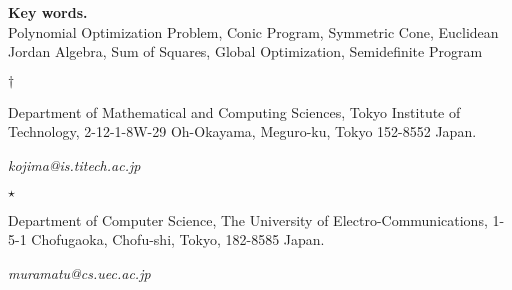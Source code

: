 \vspace{0.3cm}
  
\noindent
{\bf Key words. } \vspace{0.1cm} \\ 
Polynomial Optimization Problem, Conic Program, Symmetric Cone, 
Euclidean Jordan Algebra, 
Sum of Squares, Global Optimization, 
Semidefinite Program

\vspace{0.5cm}

\noindent
\parbox[t]{0.5cm}{$\dagger$}
\parbox[t]{14.9cm}{Department of Mathematical and Computing Sciences,
                   Tokyo Institute of Technology,
                   2-12-1-8W-29  Oh-Okayama, Meguro-ku, Tokyo 152-8552 Japan.
                   
{\it kojima@is.titech.ac.jp}
}


\medskip

\noindent
\parbox[t]{0.5cm}{$\star$}
\parbox[t]{14.9cm}{
Department of Computer Science, 
The University of Electro-Communications, 
1-5-1 Chofugaoka, Chofu-shi, Tokyo, 182-8585 Japan. 

{\it muramatu@cs.uec.ac.jp}
}
\newpage
